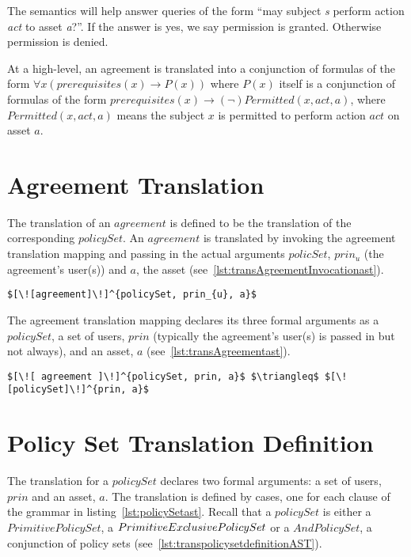 The semantics will help answer queries of the form ``may subject \emph{s} perform action \emph{act} to asset \emph{a}?''. If the answer is yes, we say permission is granted. Otherwise permission is denied. 


At a high-level, an agreement is translated into a conjunction of formulas of the form $\forall x ( prerequisites(x) \rightarrow P(x))$ where $P(x)$ itself is a conjunction of formulas of the form $ prerequisites(x) \rightarrow (\lnot) Permitted (x, act, a)$, where $Permitted (x, act, a)$ means the subject $x$ is permitted to perform action $act$ on asset $a$.

\section{Agreement Translation}
The translation of an $agreement$ is defined to be the translation of the corresponding $policySet$. An $agreement$ is translated by invoking the agreement translation mapping and passing in the actual arguments $policSet$, $prin_{u}$ (the agreement's user(s)) and $a$, the asset (see~\ref{lst:transAgreementInvocationast}). 

\lstset{mathescape, language=AST}  
\begin{lstlisting}[frame=single, caption={Agreement Translation Invocation},label={lst:transAgreementInvocationast}]
$[\![agreement]\!]^{policySet, prin_{u}, a}$
\end{lstlisting}

The agreement translation mapping declares its three formal arguments as a $policySet$, a set of users, $prin$ (typically the agreement's user(s) is passed in but not always), and an asset, $a$ (see~\ref{lst:transAgreementast}).


\lstset{mathescape, language=AST}  
\begin{lstlisting}[frame=single, caption={Agreement Translation Definition},label={lst:transAgreementast}]
$[\![ agreement ]\!]^{policySet, prin, a}$ $\triangleq$ $[\![policySet]\!]^{prin, a}$
\end{lstlisting}

\section{Policy Set Translation Definition}
The translation for a $policySet$ declares two formal arguments: a set of users, $prin$ and an asset, $a$.
The translation is defined by cases, one for each clause of the grammar in listing~\ref{lst:policySetast}. Recall that a $policySet$ is either a $PrimitivePolicySet$, a $\linebreak PrimitiveExclusivePolicySet$ or a $AndPolicySet$, a conjunction of policy sets (see~\ref{lst:transpolicysetdefinitionAST}).

